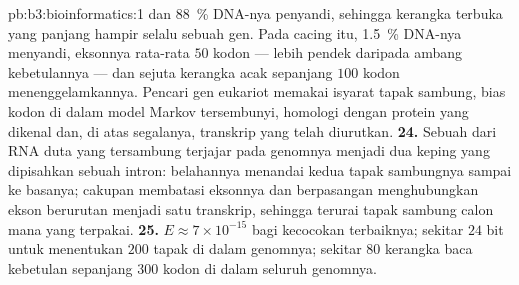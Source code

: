 \begin{solution}{pb:b3:bioinformatics:1}
dan \qty{88}{\%} DNA-nya penyandi, sehingga kerangka terbuka yang panjang
hampir selalu sebuah gen. Pada cacing itu, \qty{1.5}{\%} DNA-nya menyandi,
eksonnya rata-rata $50$ kodon --- lebih pendek daripada ambang kebetulannya ---
dan sejuta kerangka acak sepanjang $100$ kodon menenggelamkannya. Pencari gen
eukariot memakai isyarat tapak sambung, bias kodon di dalam model Markov
tersembunyi, homologi dengan protein yang dikenal dan, di atas segalanya,
transkrip yang telah diurutkan.
\textbf{24.} Sebuah  dari RNA duta yang tersambung terjajar pada
genomnya menjadi dua keping yang dipisahkan sebuah intron: belahannya menandai
kedua tapak sambungnya sampai ke basanya; cakupan  membatasi
eksonnya dan  berpasangan menghubungkan ekson berurutan menjadi satu
transkrip, sehingga terurai tapak sambung calon mana yang terpakai.
\textbf{25.} $E \approx 7\times 10^{-15}$ bagi kecocokan terbaiknya; sekitar
$24$ bit untuk menentukan $200$ tapak di dalam genomnya; sekitar $80$ kerangka
baca kebetulan sepanjang $300$ kodon di dalam seluruh genomnya.
\end{solution}
